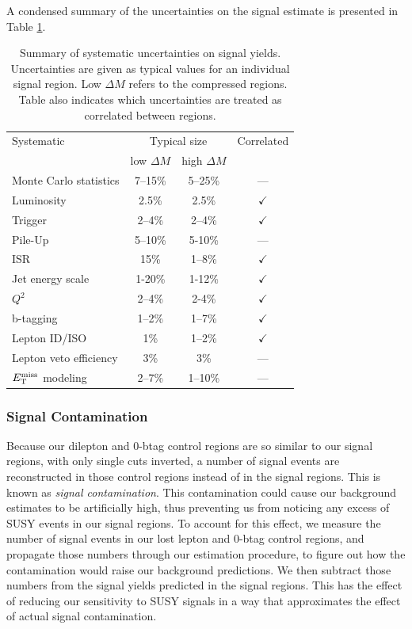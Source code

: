 A condensed summary of the uncertainties on the signal estimate is
presented in Table \ref{tab:stop:signal:systematics}.

\begin{table}[htbp]
\centering
\caption{Summary of systematic uncertainties on signal
  yields. Uncertainties are given as typical values for an individual
  signal region. Low $\Delta M$ refers to the compressed
  regions. Table also indicates which uncertainties are treated as
  correlated between regions.}
\label{tab:stop:signal:systematics}
\begin{tabular}{lccc}
\hline\hline
Systematic & \multicolumn{2}{c}{Typical size} & Correlated \\
 & low $\Delta M$ & high $\Delta M$ & \\
\hline
Monte Carlo statistics & 7--15\% & 5--25\% & ---  \\
Luminosity & 2.5\% & 2.5\% & $\checkmark$  \\
Trigger & 2--4\% & 2--4\% & $\checkmark$  \\
Pile-Up & 5--10\% & 5-10\% & ---  \\
ISR & 15\% & 1--8\% & $\checkmark$ \\
Jet energy scale & 1-20\% & 1-12\% & $\checkmark$ \\
$Q^2$ & 2--4\% & 2-4\% & $\checkmark$ \\
b-tagging & 1--2\% & 1--7\% & $\checkmark$ \\
Lepton ID/ISO & 1\% & 1--2\% & $\checkmark$ \\
Lepton veto efficiency & 3\% & 3\% & --- \\
$E_\text{T}^\text{miss}$ modeling & 2--7\% & 1--10\% & --- \\
\hline\hline
\end{tabular}
\end{table}

\subsubsection{Signal Contamination}
\label{sssec:stop:signal:contamination}

Because our dilepton and 0-btag control regions are so similar to our
signal regions, with only single cuts inverted, a number of signal
events are reconstructed in those control regions instead of in the
signal regions. This is known as \emph{signal contamination}. This
contamination could cause our background estimates to be
artificially high, thus preventing us from noticing any excess of SUSY
events in our signal regions. To account for this effect, we measure
the number of signal events in our lost lepton and 0-btag control
regions, and propagate those numbers through our estimation procedure,
to figure out how the contamination would raise our background
predictions. We then subtract those numbers from the signal yields
predicted in the signal regions. This has the effect of reducing our
sensitivity to SUSY signals in a way that approximates the effect of
actual signal contamination.

